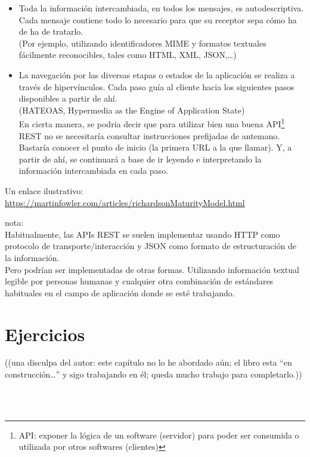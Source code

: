 \documentclass[spanish,12pt,a4paper,final,oneside]{book}
\begin{document}
\begin{itemize}
\begin{itemize}
\item Toda la información intercambiada, en todos los mensajes, es autodescriptiva. Cada mensaje contiene todo lo necesario para que su receptor sepa cómo ha de ha de tratarlo.
\\{\footnotesize (Por ejemplo, utilizando identificadores MIME y formatos textuales fácilmente reconocibles, tales como HTML, XML, JSON,\ldots)}

\item La navegación por las diversas etapas o estados de la aplicación se realiza a través de hipervínculos. Cada paso guía al cliente hacia los siguientes pasos disponibles a partir de ahí.
\\{\footnotesize (HATEOAS, Hypermedia as the Engine of Application State)}
\\En cierta manera, se podria decir que para utilizar bien una buena API\footnote{API: exponer la lógica de un software (servidor) para poder ser consumida o utilizada por otros softwares (clientes)} REST no se necesitaría consultar instrucciones prefijadas de antemano.
Bastaría conocer el punto de inicio (la primera URL a la que llamar). Y, a partir de ahí, se continuará a base de ir leyendo e interpretando la información intercambiada en cada paso.
\end{itemize}

\end{itemize}

\vspace{0.5cm}
Un enlace ilustrativo:
\\ \url{https://martinfowler.com/articles/richardsonMaturityModel.html}


\vspace{1cm}
nota: 
\\Habitualmente, las APIs REST se suelen implementar usando HTTP como protocolo de transporte/interacción y JSON como formato de estructuración de la información. 
\\Pero podrían ser implementadas de otras formas. Utilizando información textual legible por personas humanas y cualquier otra combinación de estándares habituales en el campo de aplicación donde se esté trabajando.


\chapter{Ejercicios}\label{ejercicios_organizacion}

\begin{footnotesize}((una disculpa del autor: este capítulo no lo he abordado aún; el libro esta ``en construcción\ldots'' y sigo trabajando en él; queda mucho trabajo para completarlo.))\end{footnotesize}
\\
\\
\end{document}
